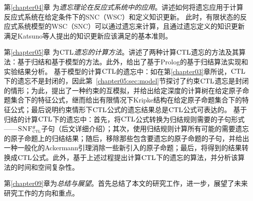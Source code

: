 第\ref{chapter04}章 为{\em 遗忘理论在反应式系统中的应用}。讲述如何将遗忘应用于计算反应式系统在给定条件下的SNC（WSC）和定义知识更新。
此时，有限状态的反应式系统模型的WSC（SNC）可以通过遗忘来计算，且通过遗忘定义的知识更新满足Katsuno等人提出的知识更新应该满足的基本准则。


第\ref{chapter05}章 为{\em $\textrm{CTL}$遗忘的计算方法}。讲述了两种计算$\textrm{CTL}$遗忘的方法及其算法：基于归结和基于模型的方法。此外，给出了基于Prolog的基于归结算法实现和实验结果分析。
基于模型的计算$\textrm{CTL}$的遗忘中：如在第\ref{chapter03}章所说，$\textrm{CTL}$下的遗忘不是封闭的，因此第~\ref{chapter05:sec:model}节探讨了约束$\textrm{CTL}$遗忘是封闭的情形；为此，提出了一种约束的互模拟，并给出给定深度的计算树在给定原子命题集合下的特征公式，继而给出有限情况下Kripke结构在给定原子命题集合下的特征公式；最后说明约束情形下$\textrm{CTL}$公式的遗忘结果总是$\textrm{CTL}$公式可表达的。
基于归结的计算$\textrm{CTL}$下的遗忘中：首先，将$\textrm{CTL}$公式转换为归结规则需要的子句形式——${\textsc{SNF}_{\textsc{ctl}}^g}$子句（后文详细介绍）；其次，使用归结规则计算所有可能的需要遗忘的原子命题上的归结结果；随后，移除那些包含要遗忘的原子命题的子句，并给出一种一般化的Ackermann引理消除一些新引入的原子命题；最后，将得到的结果转换成$\textrm{CTL}$公式。此外，基于上述过程提出计算$\textrm{CTL}$下的遗忘的算法，并分析该算法的时间和空间复杂性。













第\ref{chapter09}章为\textit{总结与展望}。首先总结了本文的研究工作，进一步，展望了未来研究工作的方向和重点。
